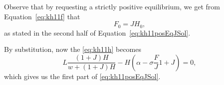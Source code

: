 Observe that by requesting a strictly positive equilibrium, we get from Equation~\eqref{eq:kh11f} that
$$F_0 = J H_0,$$
as stated in the second half of Equation~\eqref{eq:kh11posEqJSol}.

By substitution, now the \eqref{eq:kh11h} becomes
$$L \frac{(1+J)H}{w +(1+J)H} - H \left( \alpha - \sigma \frac{F}{J}{1+J} \right) = 0, $$
which gives us the first part of \eqref{eq:kh11posEqJSol}.






